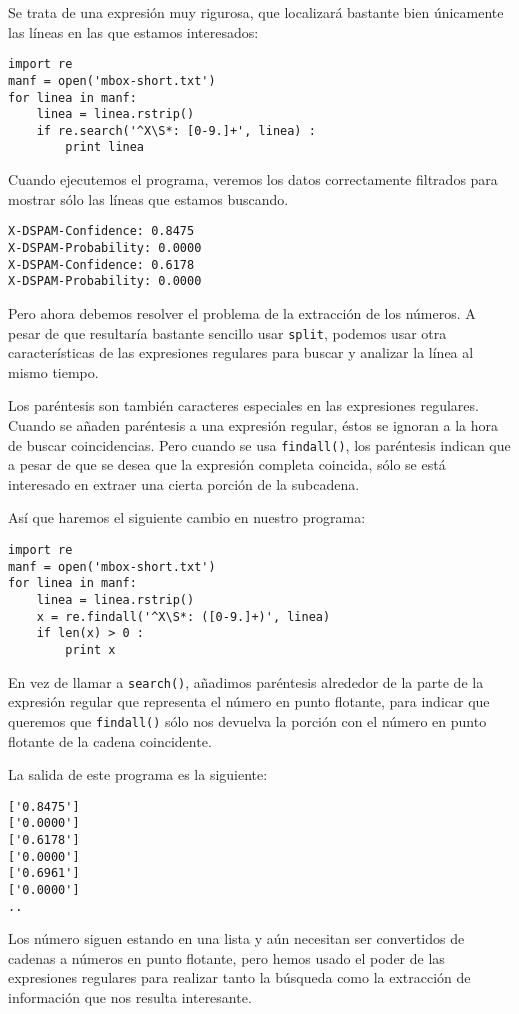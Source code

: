 Se trata de una expresión muy rigurosa, que localizará bastante bien únicamente las líneas en las que
estamos interesados:

\beforeverb
\begin{verbatim}
import re
manf = open('mbox-short.txt')
for linea in manf:
    linea = linea.rstrip()
    if re.search('^X\S*: [0-9.]+', linea) :
        print linea
\end{verbatim}
\afterverb
%
Cuando ejecutemos el programa, veremos los datos correctamente filtrados
para mostrar sólo las líneas que estamos buscando.

\beforeverb
\begin{verbatim}
X-DSPAM-Confidence: 0.8475
X-DSPAM-Probability: 0.0000
X-DSPAM-Confidence: 0.6178
X-DSPAM-Probability: 0.0000
\end{verbatim}
\afterverb
%
Pero ahora debemos resolver el problema de la extracción de los números. A pesar de que resultaría
bastante sencillo usar {\tt split}, podemos usar otra características de las expresiones regulares para
buscar y analizar la línea al mismo tiempo.

Los paréntesis son también caracteres especiales en las expresiones regulares. Cuando se añaden paréntesis
a una expresión regular, éstos se ignoran a la hora de buscar coincidencias. Pero cuando se usa
{\tt findall()}, los paréntesis indican que a pesar de que se desea que la expresión completa coincida,
sólo se está interesado en extraer una cierta porción de la subcadena.

Así que haremos el siguiente cambio en nuestro programa:

\beforeverb
\begin{verbatim}
import re
manf = open('mbox-short.txt')
for linea in manf:
    linea = linea.rstrip()
    x = re.findall('^X\S*: ([0-9.]+)', linea)
    if len(x) > 0 :
        print x
\end{verbatim}
\afterverb
%
En vez de llamar a {\tt search()}, añadimos paréntesis alrededor de la parte de la expresión regular
que representa el número en punto flotante, para indicar que queremos que {\tt findall()} sólo nos devuelva
la porción con el número en punto flotante de la cadena coincidente.

La salida de este programa es la siguiente:

\beforeverb
\begin{verbatim}
['0.8475']
['0.0000']
['0.6178']
['0.0000']
['0.6961']
['0.0000']
..
\end{verbatim}
\afterverb
%
Los número siguen estando en una lista y aún necesitan ser convertidos de cadenas a números en punto flotante, pero
hemos usado el poder de las expresiones regulares para realizar tanto la búsqueda como la extracción de información
que nos resulta interesante.

